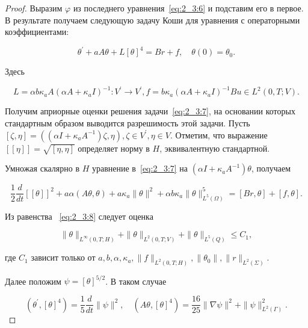 \begin{proof}
    Выразим $\varphi$ из последнего уравнения~\eqref{eq:2_3:6} и подставим его в первое.
    В результате получаем следующую задачу Коши для уравнения с операторными коэффициентами:

    \begin{equation}
        \label{eq:2_3:7}
        \theta^{\prime}+a A \theta+L[\theta]^{4}=B r+f, \quad \theta(0)=\theta_{0}.
    \end{equation}

    Здесь

    \[
        L=\alpha b \kappa_{a} A\left(\alpha A+\kappa_{a} I\right)^{-1}: V^{\prime}
        \rightarrow V^{\prime}, f=b \kappa_{a}\left(\alpha A
        +\kappa_{a} I\right)^{-1} B u \in L^{2}(0, T ; V).
    \]

    Получим априорные оценки решения задачи~\eqref{eq:2_3:7},
    на основании которых стандартным образом выводится
    разрешимость этой задачи.
    Пусть $[\zeta, \eta]=\left(\left(\alpha I+\kappa_{a} A^{-1}\right) \zeta,
    \eta\right), \zeta \in V^{\prime}, \eta \in V$.
    Отметим, что выражение $[[\eta]]=\sqrt{[\eta, \eta]}$ определяет норму в $H$,
    эквивалентную стандартной.

    Умножая скалярно в $H$ уравнение в~\eqref{eq:2_3:7}
    на $\left(\alpha I+\kappa_{a} A^{-1}\right) \theta$, получаем

    \begin{equation}
        \label{eq:2_3:8}
        \frac{1}{2} \frac{d}{d t}[[\theta]]^{2}+a
        \alpha(A \theta, \theta)+a \kappa_{a}\|\theta\|^{2}+\alpha
        b \kappa_{a}\|\theta\|_{L^{5}(\Omega)}^{5}=[B r, \theta] + [f, \theta].
    \end{equation}

    Из равенства ~\eqref{eq:2_3:8} следует оценка

    \begin{equation}
        \label{eq:2_3:9}
        \|\theta\|_{L^{\infty}(0, T ; H)}+\|\theta\|_{L^{2}(0, T ; V)}
        +\|\theta\|_{L^{5}(Q)} \leq C_{1},
    \end{equation}


    где $C_{1}$ зависит только от $a, b, \alpha, \kappa_{a},\|f\|_{L^{2}(0, T ; H)},
    \left\|\theta_{0}\right\|,\|r\|_{L^{2}(\Sigma)}$.

    Далее положим $\psi=[\theta]^{5 / 2}$.
    В таком случае

    \[
        \left(\theta^{\prime},[\theta]^{4}\right)=\frac{1}{5} \frac{d}{d t}\|\psi\|^{2},
        \quad\left(A \theta,[\theta]^{4}\right)=\frac{16}{25}\|\nabla \psi\|^{2}
        +\|\psi\|_{L^{2}(\Gamma)}^{2}.
    \]


\end{proof}
